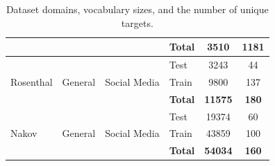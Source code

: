 \documentclass[12pt, a4paper]{report}
\theoremstyle{definition}
\theoremstyle{definition}%
\theoremstyle{definition}%
\theoremstyle{definition}%
\theoremstyle{definition}%
\theoremstyle{definition}%
\begin{document}
\begin{table}[]
\begin{tabular}{|l|l|l|l|c|c|}
                                       &                                      &                                    & \textbf{Total}                      & \textbf{3510}                                                       & \textbf{1181}                                                      \\ \hline\hline
\multirow{3}{*}{Rosenthal}             & \multirow{3}{*}{General}             & \multirow{3}{*}{Social Media}      & Test                                & 3243                                                                & 44                                                                 \\
                                       &                                      &                                    & Train                               & 9800                                                                & 137                                                                \\ \cline{4-6} 
                                       &                                      &                                    & \textbf{Total}                      & \textbf{11575}                                                      & \textbf{180}                                                       \\ \hline\hline
\multirow{3}{*}{Nakov}                 & \multirow{3}{*}{General}             & \multirow{3}{*}{Social Media}      & Test                                & 19374                                                               & 60                                                                 \\
                                       &                                      &                                    & Train                               & 43859                                                               & 100                                                                \\ \cline{4-6} 
                                       &                                      &                                    & \textbf{Total}                      & \textbf{54034}                                                      & \textbf{160}                                                       \\ \hline
\end{tabular}
\caption{Dataset domains, vocabulary sizes, and the number of unique targets.}
\label{tab:dataset_domain_vocab}
\end{table}
\end{document}
